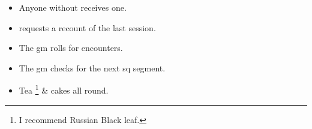 
\begin{itemize}
  \item
  Anyone without  receives one.
  \item
   requests a recount of the last session.
  \item
  The \gls{gm} rolls for encounters.
  \item
  The \gls{gm} checks for the next \gls{sq} \gls{segment}.
  \item
  Tea%
  \footnote{I recommend Russian Black leaf.}
  \& cakes all round.
\end{itemize}
